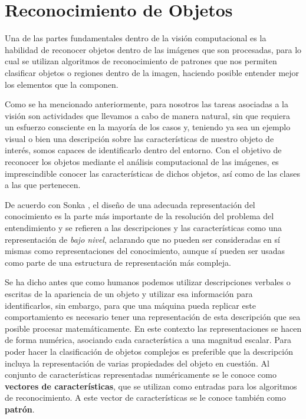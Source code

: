 
\section{Reconocimiento de Objetos}
Una de las partes fundamentales dentro de la visión computacional es la habilidad de reconocer objetos dentro de las imágenes que son procesadas, para lo cual se utilizan algoritmos de reconocimiento de patrones que nos permiten clasificar objetos o regiones dentro de la imagen, haciendo posible entender mejor los elementos que la componen.

Como se ha mencionado anteriormente, para nosotros las tareas asociadas a la visión son actividades que llevamos a cabo de manera natural, sin que requiera un esfuerzo consciente en la mayoría de los casos y, teniendo ya sea un ejemplo visual o bien una descripción sobre las características de nuestro objeto de interés, somos capaces de identificarlo dentro del entorno. Con el objetivo de reconocer los objetos mediante el análisis computacional de las imágenes, es imprescindible conocer las características de dichos objetos, así como de las clases a las que pertenecen.

De acuerdo con Sonka \cite{sonka_image_2008}, el diseño de una adecuada representación del conocimiento es la parte más importante de la resolución del problema del entendimiento y se refieren a las descripciones y las características como una representación de \textit{bajo nivel}, aclarando que no pueden ser consideradas en sí mismas como representaciones del conocimiento, aunque sí pueden ser usadas como parte de una estructura de representación más compleja.

Se ha dicho antes que como humanos podemos utilizar descripciones verbales o escritas de la apariencia de un objeto y utilizar esa información para identificarlos, sin embargo, para que una máquina pueda replicar este comportamiento es necesario tener  una representación de esta descripción que sea posible procesar matemáticamente. En este contexto las representaciones se hacen de forma numérica, asociando cada característica a una magnitud escalar. 
Para poder hacer la clasificación de objetos complejos es preferible que la descripción incluya la representación de varias propiedades del objeto en cuestión. Al conjunto de características representadas numéricamente se le conoce como \textbf{vectores de características}, que se utilizan como entradas para los algoritmos de reconocimiento. A este vector de características se le conoce también como \textbf{patrón}.

